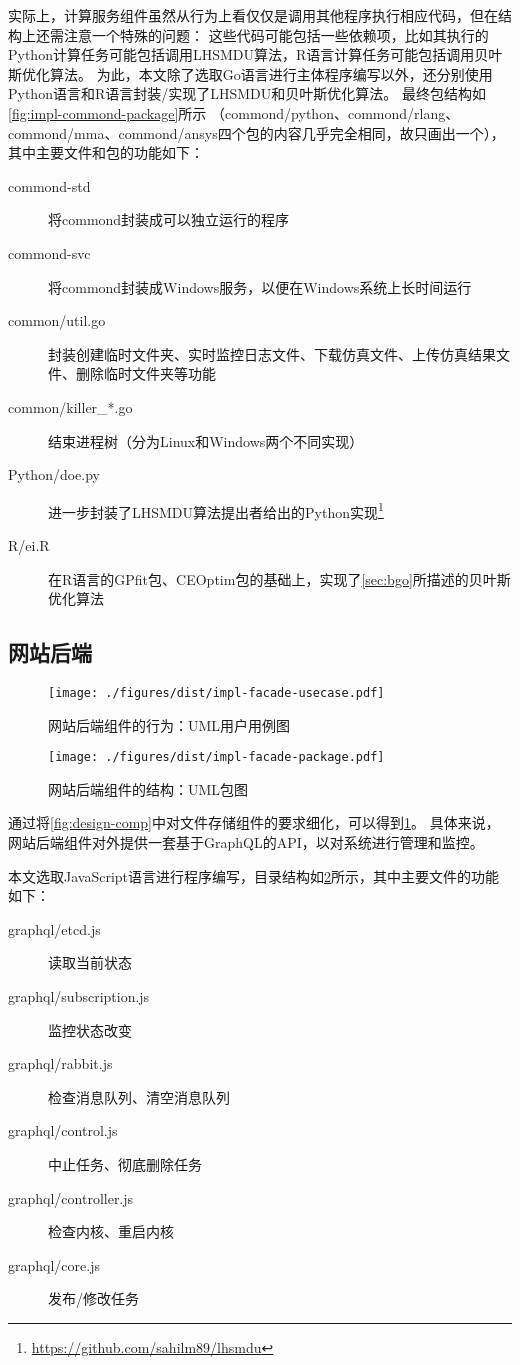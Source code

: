 \documentclass[index]{subfiles}
\begin{document}
实际上，计算服务组件虽然从行为上看仅仅是调用其他程序执行相应代码，但在结构上还需注意一个特殊的问题：
这些代码可能包括一些依赖项，比如其执行的Python计算任务可能包括调用LHSMDU算法，R语言计算任务可能包括调用贝叶斯优化算法。
为此，本文除了选取Go语言进行主体程序编写以外，还分别使用Python语言和R语言封装/实现了LHSMDU和贝叶斯优化算法。
最终包结构如\cref{fig:impl-commond-package}所示
（commond/python、commond/rlang、commond/mma、commond/ansys四个包的内容几乎完全相同，故只画出一个），
其中主要文件和包的功能如下：
\begin{description}
  \item[commond-std] 将commond封装成可以独立运行的程序
  \item[commond-svc] 将commond封装成Windows服务，以便在Windows系统上长时间运行
  \item[common/util.go] 封装创建临时文件夹、实时监控日志文件、下载仿真文件、上传仿真结果文件、删除临时文件夹等功能
  \item[common/killer\_*.go] 结束进程树（分为Linux和Windows两个不同实现）
  \item[Python/doe.py] 进一步封装了LHSMDU算法提出者给出的Python实现\footnote{\href{https://github.com/sahilm89/lhsmdu}{https://github.com/sahilm89/lhsmdu}}
  \item[R/ei.R] 在R语言的GPfit包\cite{macdonald2015}、CEOptim包\cite{benham2015}的基础上，实现了\cref{sec:bgo}所描述的贝叶斯优化算法
\end{description}

\subsection{网站后端}
\begin{figure}[h]
  \centering
  \texttt{[image: ./figures/dist/impl-facade-usecase.pdf]}
  \caption{网站后端组件的行为：UML用户用例图\label{fig:impl-facade-usecase}}
\end{figure}
\begin{figure}[h]
  \centering
  \texttt{[image: ./figures/dist/impl-facade-package.pdf]}
  \caption{网站后端组件的结构：UML包图\label{fig:impl-facade-package}}
\end{figure}

通过将\cref{fig:design-comp}中对文件存储组件的要求细化，可以得到\cref{fig:impl-facade-usecase}。
具体来说，网站后端组件对外提供一套基于GraphQL的API，以对系统进行管理和监控。

本文选取JavaScript语言进行程序编写，目录结构如\cref{fig:impl-facade-package}所示，其中主要文件的功能如下：
\begin{description}
  \item[graphql/etcd.js] 读取当前状态
  \item[graphql/subscription.js] 监控状态改变
  \item[graphql/rabbit.js] 检查消息队列、清空消息队列
  \item[graphql/control.js] 中止任务、彻底删除任务
  \item[graphql/controller.js] 检查内核、重启内核
  \item[graphql/core.js] 发布/修改任务
\end{description}
\end{document}
